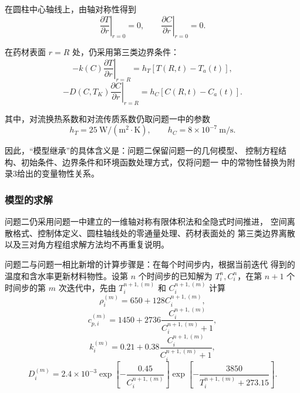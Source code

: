 \documentclass[12pt,a4paper]{article}
\renewcommand{\boxed}[1]{#1}
\begin{document}
在圆柱中心轴线上，由轴对称性得到
\begin{equation}
\boxed{
\left.\frac{\partial T}{\partial r}\right|_{r=0}=0,\qquad
\left.\frac{\partial C}{\partial r}\right|_{r=0}=0
}.
\end{equation}

在药材表面 $r=R$ 处，仍采用第三类边界条件：
\begin{equation}
\boxed{
-k(C)\left.\frac{\partial T}{\partial r}\right|_{r=R}
=
h_T\left[T(R,t)-T_a(t)\right]
},
\end{equation}
\begin{equation}
\boxed{
-D(C,T_K)\left.\frac{\partial C}{\partial r}\right|_{r=R}
=
h_C\left[C(R,t)-C_a(t)\right]
}.
\end{equation}

其中，对流换热系数和对流传质系数仍取问题一中的参数
\begin{equation}
h_T=25\ \mathrm{W/(m^2\cdot K)},\qquad
h_C=8\times10^{-7}\ \mathrm{m/s}.
\end{equation}

因此，“模型继承”的具体含义是：问题二保留问题一的几何模型、
控制方程结构、初始条件、边界条件和环境函数处理方式，仅将问题一
中的常物性替换为附录3给出的变量物性关系。

\subsubsection{模型的求解}

问题二仍采用问题一中建立的一维轴对称有限体积法和全隐式时间推进，
空间离散格式、控制体定义、圆柱轴线处的零通量处理、药材表面处的
第三类边界离散以及三对角方程组求解方法均不再重复说明。

问题二与问题一相比新增的计算步骤是：在每个时间步内，根据当前迭代
得到的温度和含水率更新材料物性。设第 $n$ 个时间步的已知解为
$T_i^n,C_i^n$，在第 $n+1$ 个时间步的第 $m$ 次迭代中，先由
$T_i^{n+1,(m)}$ 和 $C_i^{n+1,(m)}$ 计算
\begin{equation}
\rho_i^{(m)}
=
650+128C_i^{n+1,(m)},
\end{equation}
\begin{equation}
c_{p,i}^{(m)}
=
1450+2736
\frac{C_i^{n+1,(m)}}{C_i^{n+1,(m)}+1},
\end{equation}
\begin{equation}
k_i^{(m)}
=
0.21+0.38
\frac{C_i^{n+1,(m)}}{C_i^{n+1,(m)}+1},
\end{equation}
\begin{equation}
D_i^{(m)}
=
2.4\times10^{-3}
\exp\left[
-\frac{0.45}{C_i^{n+1,(m)}}
\right]
\exp\left[
-\frac{3850}{T_i^{n+1,(m)}+273.15}
\right].
\end{equation}
\end{document}
